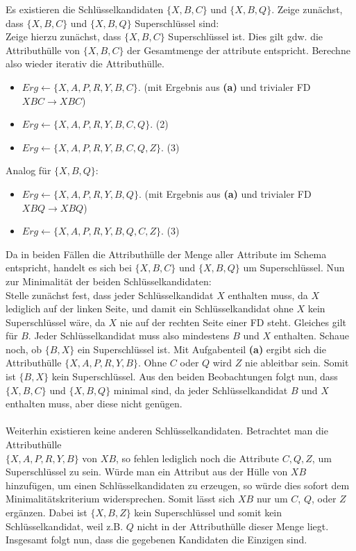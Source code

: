 \documentclass[11pt, a4paper]{article}
\newcommand{\rA}{\rightarrow}
\begin{document}
\begin{adjustwidth}{20pt}{20pt}
	Es existieren die Schlüsselkandidaten $\{ X,B,C\}$ und $\{ X,B,Q\}$. Zeige zunächst, dass $\{ X,B,C\}$ und $\{ X,B,Q\}$ Superschlüssel sind:  \\
	Zeige hierzu zunächst, dass $\{ X,B,C\}$ Superschlüssel ist. Dies gilt gdw. die Attributhülle von $\{ X,B,C\}$ der Gesamtmenge der attribute entspricht. Berechne also wieder iterativ
	die Attributhülle.
	\begin{itemize}
	\item $Erg \leftarrow \{ X,A,P,R,Y,B,C\}$. (mit Ergebnis aus \textbf{(a)} und trivialer FD $XBC \rA XBC$)
	\item $Erg \leftarrow \{ X,A,P,R,Y,B,C,Q\}$. (2)
	\item $Erg \leftarrow \{ X,A,P,R,Y,B,C,Q,Z\}$. (3)
	\end{itemize}
	Analog für $\{ X,B,Q\}$:
	\begin{itemize}
	\item $Erg \leftarrow \{ X,A,P,R,Y,B,Q\}$. (mit Ergebnis aus \textbf{(a)} und trivialer FD $XBQ \rA XBQ$)
	\item $Erg \leftarrow \{ X,A,P,R,Y,B,Q,C,Z\}$. (3)
	\end{itemize}
	Da in beiden Fällen die Attributhülle der Menge aller Attribute im Schema entspricht, handelt es sich bei $\{ X,B,C\}$ und $\{ X,B,Q\}$ um Superschlüssel. Nun zur Minimalität
	der beiden Schlüsselkandidaten:\\
	Stelle zunächst fest, dass jeder Schlüsselkandidat $X$ enthalten muss, da $X$ lediglich auf der linken Seite, und damit ein
	Schlüsselkandidat ohne $X$ kein Superschlüssel wäre, da $X$ nie auf der rechten Seite einer FD steht. Gleiches gilt für $B$. Jeder Schlüsselkandidat muss also mindestens
	$B$ und $X$ enthalten. Schaue noch, ob $\{ B,X\}$ ein Superschlüssel ist. Mit Aufgabenteil \textbf{(a)} ergibt sich die Attributhülle $\{ X,A,P,R,Y,B\}$. Ohne $C$ oder $Q$
	wird $Z$ nie ableitbar sein. Somit ist $\{ B,X\}$ kein Superschlüssel. Aus den beiden Beobachtungen folgt nun, dass $\{ X,B,C\}$ und $\{ X,B,Q\}$ minimal sind, da
	jeder Schlüsselkandidat $B$ und $X$ enthalten muss, aber diese nicht genügen.\\ \ \\
	Weiterhin existieren keine anderen Schlüsselkandidaten. Betrachtet man die Attributhülle\\ $\{ X,A,P,R,Y,B\}$ von $XB$, so fehlen lediglich noch die Attribute $C,Q,Z$, um
	Superschlüssel zu sein. Würde man ein Attribut aus der Hülle von $XB$ hinzufügen, um einen Schlüsselkandidaten zu erzeugen, so würde dies sofort dem Minimalitätskriterium
	widersprechen. Somit lässt sich $XB$ nur um $C$, $Q$, oder $Z$ ergänzen. Dabei ist $\{X,B,Z\}$ kein Superschlüssel und somit kein Schlüsselkandidat, weil z.B. $Q$
	nicht in der Attributhülle dieser Menge liegt. Insgesamt folgt nun, dass die gegebenen Kandidaten die Einzigen sind.
\end{adjustwidth}
\end{document}
